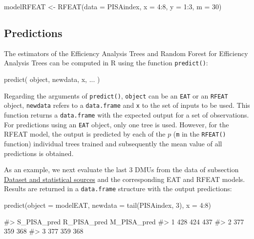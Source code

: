 \begin{Schunk}
\begin{Sinput}
modelRFEAT <- RFEAT(data = PISAindex, x = 4:8, y = 1:3, m = 30)
\end{Sinput}
\end{Schunk}

\hypertarget{predictions}{%
\subsection{Predictions}\label{predictions}}

The estimators of the Efficiency Analysis Trees and Random Forest for
Efficiency Analysis Trees can be computed in R using the function
\texttt{predict()}:

\begin{Schunk}
\begin{Sinput}
predict(
  object,
  newdata,
  x, ...
)
\end{Sinput}
\end{Schunk}

Regarding the arguments of \texttt{predict()}, \texttt{object} can be an
\texttt{EAT} or an \texttt{RFEAT} object, \texttt{newdata} refers to a
\texttt{data.frame} and \texttt{x} to the set of inputs to be used. This
function returns a \texttt{data.frame} with the expected output for a
set of observations. For predictions using an \texttt{EAT} object, only
one tree is used. However, for the RFEAT model, the output is predicted
by each of the \(p\) (\texttt{m} in the \texttt{RFEAT()} function)
individual trees trained and subsequently the mean value of all
predictions is obtained.

As an example, we next evaluate the last 3 DMUs from the data of
subsection \protect\hyperlink{section3.1}{Dataset and statistical
sources} and the corresponding EAT and RFEAT models. Results are
returned in a \texttt{data.frame} structure with the output predictions:

\begin{Schunk}
\begin{Sinput}
predict(object = modelEAT, newdata = tail(PISAindex, 3), x = 4:8)
\end{Sinput}
\begin{Soutput}
#>   S_PISA_pred R_PISA_pred M_PISA_pred
#> 1         428         424         437
#> 2         377         359         368
#> 3         377         359         368
\end{Soutput}
\end{Schunk}

